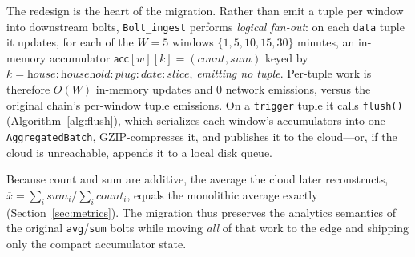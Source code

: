 \documentclass[conference]{IEEEtran}
\newcommand{\code}[1]{\texttt{#1}}
\begin{document}
The redesign is the heart of the migration. Rather than emit a tuple per window
into downstream bolts, \code{Bolt\_ingest} performs \emph{logical fan-out}: on
each \code{data} tuple it updates, for each of the $W=5$ windows
$\{1,5,10,15,30\}$ minutes, an in-memory accumulator
$\textsf{acc}[w][k]=(\textit{count},\textit{sum})$ keyed by
$k=\textit{house}{:}\textit{household}{:}\textit{plug}{:}\textit{date}{:}\textit{slice}$,
\emph{emitting no tuple}. Per-tuple work is therefore $O(W)$ in-memory updates
and $0$ network emissions, versus the original chain's per-window tuple
emissions. On a \code{trigger} tuple it calls \code{flush()}
(Algorithm~\ref{alg:flush}), which serializes each window's accumulators into one
\code{AggregatedBatch}, GZIP-compresses it, and publishes it to the cloud---or,
if the cloud is unreachable, appends it to a local disk queue.

Because count and sum are additive, the average the cloud later reconstructs,
$\overline{x}=\sum_i \textit{sum}_i / \sum_i \textit{count}_i$, equals the
monolithic average exactly (Section~\ref{sec:metrics}). The migration thus
preserves the analytics semantics of the original \code{avg}/\code{sum} bolts
while moving \emph{all} of that work to the edge and shipping only the compact
accumulator state.
\end{document}
